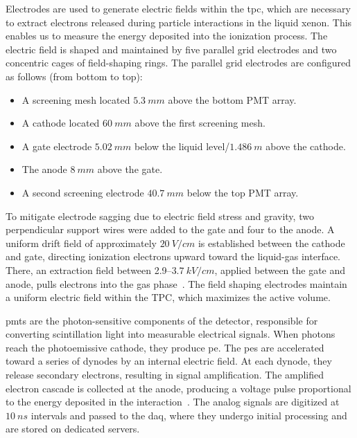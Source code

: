 Electrodes are used to generate electric fields within the \gls{tpc}, which are necessary to extract electrons released during particle interactions in the liquid xenon. This enables us to measure the energy deposited into the ionization process. The electric field is shaped and maintained by five parallel grid electrodes and two concentric cages of field-shaping rings. The parallel grid electrodes are configured as follows (from bottom to top):
\begin{itemize}
    \item A screening mesh located $\SI{5.3}{mm}$ above the bottom PMT array.
    \item A cathode located $\SI{60}{mm}$ above the first screening mesh.
    \item A gate electrode $\SI{5.02}{mm}$ below the liquid level/$\SI{1.486}{m}$ above the cathode.
    \item The anode $\SI{8}{mm}$ above the gate.
    \item A second screening electrode $\SI{40.7}{mm}$ below the top PMT array.
\end{itemize}
To mitigate electrode sagging due to electric field stress and gravity, two perpendicular support wires were added to the gate and four to the anode. A uniform drift field of approximately $\SI{20}{V/cm}$ is established between the cathode and gate, directing ionization electrons upward toward the liquid-gas interface. There, an extraction field between 2.9–$\SI{3.7}{kV/cm}$, applied between the gate and anode, pulls electrons into the gas phase~\cite{XENON:2024wpa}. The field shaping electrodes maintain a uniform electric field within the TPC, which maximizes the active volume.

\Glspl{pmt} are the photon-sensitive components of the detector, responsible for converting scintillation light into measurable electrical signals. 
When photons reach the photoemissive cathode, they produce \acrfull{pe}. The \glspl{pe} are accelerated toward a series of dynodes by an internal electric field. At each dynode, they release secondary electrons, resulting in signal amplification. The amplified electron cascade is collected at the anode, producing a voltage pulse proportional to the energy deposited in the interaction~\cite{hamamatsuPMT}. The analog signals are digitized at $\SI{10}{ns}$ intervals and passed to the \acrfull{daq}, where they undergo initial processing and are stored on dedicated servers.



